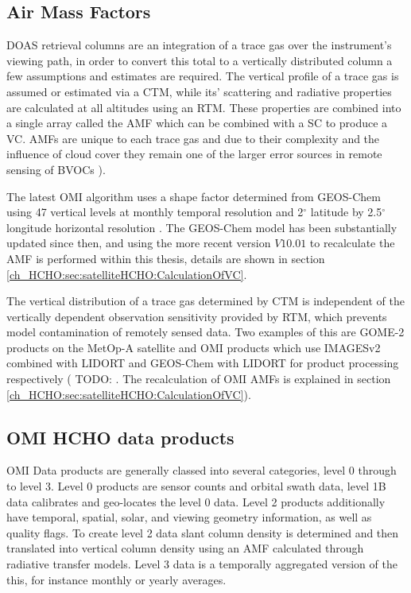   
  \subsection{Air Mass Factors}
    \label{ch_HCHO:sec:satelliteHCHO:AMFs}
    DOAS retrieval columns are an integration of a trace gas over the instrument's viewing path, in order to convert this total to a vertically distributed column a few assumptions and estimates are required. 
    The vertical profile of a trace gas is assumed or estimated via a CTM, while its' scattering and radiative properties are calculated at all altitudes using an RTM. 
    These properties are combined into a single array called the AMF which can be combined with a SC to produce a VC.
    AMFs are unique to each trace gas and due to their complexity and the influence of cloud cover they remain one of the larger error sources in remote sensing of BVOCs \citep{Palmer2001,Millet2006}).
    
    The latest OMI algorithm uses a shape factor determined from GEOS-Chem using 47 vertical levels at monthly temporal resolution and 2$^{\circ}$ latitude by 2.5$^{\circ}$ longitude horizontal resolution \citep{Abad2015}.
    The GEOS-Chem model has been substantially updated since then, and using the more recent version $V10.01$ to recalculate the AMF is performed within this thesis, details are shown in section \ref{ch_HCHO:sec:satelliteHCHO:CalculationOfVC}.
    
    The vertical distribution of a trace gas determined by CTM is independent of the vertically dependent observation sensitivity provided by RTM, which prevents model contamination of remotely sensed data.
    Two examples of this are GOME-2 products on the MetOp-A satellite and OMI products which use IMAGESv2 combined with LIDORT and GEOS-Chem with LIDORT for product processing respectively ( TODO: %
    \citep{Abad2015}.
    The recalculation of OMI AMFs is explained in section \ref{ch_HCHO:sec:satelliteHCHO:CalculationOfVC}).
  
  \subsection{OMI HCHO data products}
    OMI Data products are generally classed into several categories, level 0 through to level 3. Level 0 products are sensor counts and orbital swath data, level 1B data calibrates and geo-locates the level 0 data. Level 2 products additionally have temporal, spatial, solar, and viewing geometry information, as well as quality flags.
    To create level 2 data slant column density is determined and then translated into vertical column density using an AMF calculated through radiative transfer models. Level 3 data is a temporally aggregated version of the this, for instance monthly or yearly averages.
    
